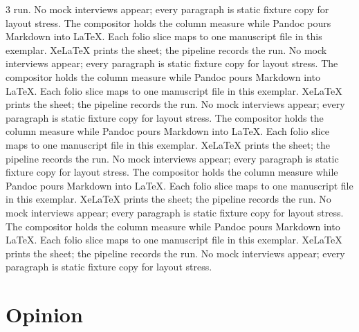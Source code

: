\documentclass[
]{article}
\begin{document}
\begin{multicols}{3}
run. No mock interviews appear; every paragraph is static fixture copy
for layout stress. The compositor holds the column measure while Pandoc
pours Markdown into LaTeX. Each folio slice maps to one manuscript file
in this exemplar. XeLaTeX prints the sheet; the pipeline records the
run. No mock interviews appear; every paragraph is static fixture copy
for layout stress. The compositor holds the column measure while Pandoc
pours Markdown into LaTeX. Each folio slice maps to one manuscript file
in this exemplar. XeLaTeX prints the sheet; the pipeline records the
run. No mock interviews appear; every paragraph is static fixture copy
for layout stress. The compositor holds the column measure while Pandoc
pours Markdown into LaTeX. Each folio slice maps to one manuscript file
in this exemplar. XeLaTeX prints the sheet; the pipeline records the
run. No mock interviews appear; every paragraph is static fixture copy
for layout stress. The compositor holds the column measure while Pandoc
pours Markdown into LaTeX. Each folio slice maps to one manuscript file
in this exemplar. XeLaTeX prints the sheet; the pipeline records the
run. No mock interviews appear; every paragraph is static fixture copy
for layout stress. The compositor holds the column measure while Pandoc
pours Markdown into LaTeX. Each folio slice maps to one manuscript file
in this exemplar. XeLaTeX prints the sheet; the pipeline records the
run. No mock interviews appear; every paragraph is static fixture copy
for layout stress.

\end{multicols}

\newpage

\section{Opinion}\label{opinion}
\end{document}
